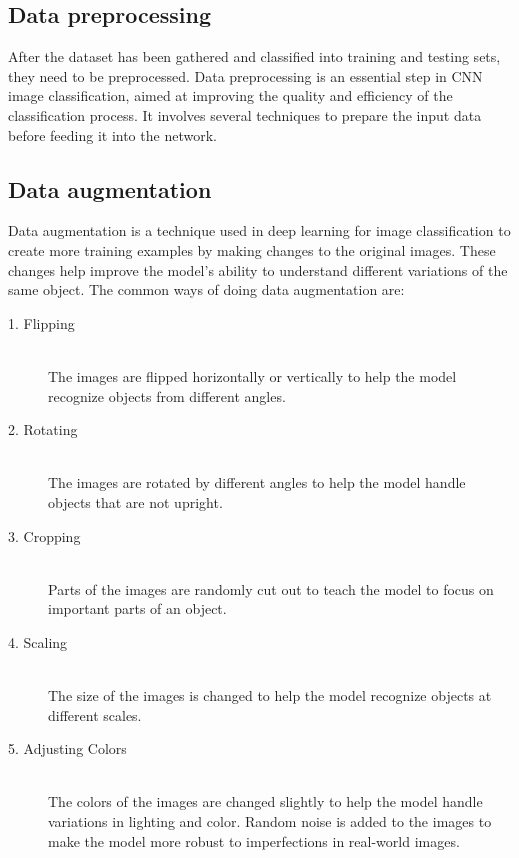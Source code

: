 \subsection{ Data preprocessing}
\vspace{-18pt}
After the dataset has been gathered and classified into training and testing sets, they need to be preprocessed. Data preprocessing is an essential step in CNN image classification, aimed at improving the quality and efficiency of the classification process. It involves several techniques to prepare the input data before feeding it into the network.
\par

\subsection{Data augmentation}
\vspace{-18pt}
Data augmentation is a technique used in deep learning for image classification to create more training examples by making changes to the original images. These changes help improve the model's ability to understand different variations of the same object. The common ways of doing data augmentation are:
\begin{description}
\item[1. Flipping] \hfill \\
 The images are flipped horizontally or vertically to help the model recognize objects from different angles.
\item[2. Rotating] \hfill \\
 The images are rotated by different angles to help the model handle objects that are not upright.
 \item[3. Cropping] \hfill \\
 Parts of the images are randomly cut out to teach the model to focus on important parts of an object.
 \item[4. Scaling] \hfill \\
The size of the images is changed to help the model recognize objects at different scales.
 \item[5. Adjusting Colors] \hfill \\
 The colors of the images are changed slightly to help the model handle variations in lighting and color.
 Random noise is added to the images to make the model more robust to imperfections in real-world images.
\end{description}
\par 

